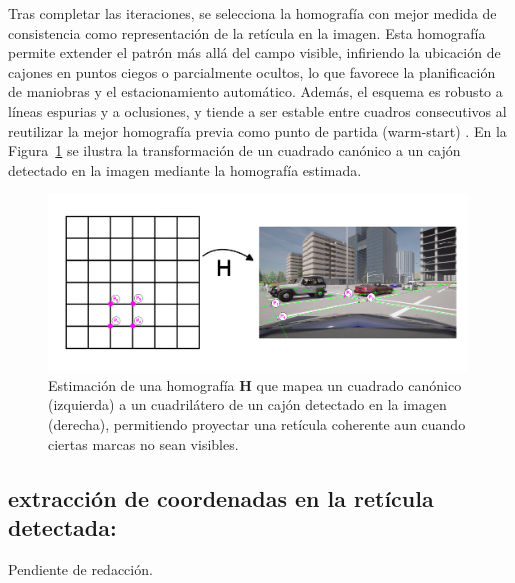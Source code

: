 Tras completar las iteraciones, se selecciona la homografía con mejor medida de consistencia 
como representación de la retícula en la imagen. 
Esta homografía permite extender el patrón más allá del campo visible, 
infiriendo la ubicación de cajones en puntos ciegos o parcialmente ocultos, 
lo que favorece la planificación de maniobras y el estacionamiento automático. 
Además, el esquema es robusto a líneas espurias y a oclusiones, 
y tiende a ser estable entre cuadros consecutivos al reutilizar la mejor homografía previa como
punto de partida (warm-start) . En la Figura~\ref{fig:ramsac-transform} se ilustra 
la transformación de un cuadrado canónico a un cajón detectado en la imagen mediante la homografía estimada.


\begin{figure}[!ht]
    \centering
    \includegraphics[width=0.99\textwidth]{img/3-metodo/transformacion.png}
    \caption{Estimación de una homografía \(\mathbf{H}\) que mapea un cuadrado canónico (izquierda) a un cuadrilátero de un cajón detectado en la imagen (derecha), permitiendo proyectar una retícula coherente aun cuando ciertas marcas no sean visibles.}
    \label{fig:ramsac-transform}
\end{figure}

\subsection{extracción de coordenadas en la retícula detectada:}
Pendiente de redacción.
